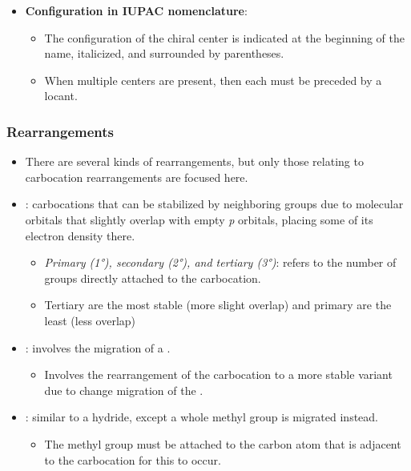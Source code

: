 \begin{itemize}
\begin{itemize}
    \bigskip

    \item \textbf{Configuration in IUPAC nomenclature}:
    \begin{itemize}
        \item The configuration of the chiral center is indicated at the beginning of the name, italicized, and surrounded by parentheses.
        \item When multiple centers are present, then each must be preceded by a locant.
    \end{itemize}
  \end{itemize}

  \subsubsection{Rearrangements}\label{Rearrangements}
    \begin{itemize}
        \item There are several kinds of rearrangements, but only those relating to carbocation rearrangements are focused here.
        \item {}: carbocations that can be stabilized by neighboring groups due to molecular orbitals that slightly overlap with empty \textit{p} orbitals, placing some of its electron density there.
            \begin{itemize}
                \item \emph{Primary (\ang{1}), secondary (\ang{2}), and tertiary (\ang{3})}: refers to the number of groups directly attached to the carbocation.
                \item Tertiary are the most stable (more slight overlap) and primary are the least (less overlap)
            \end{itemize}
        \item {}: involves the migration of a .
            \begin{itemize}
                \item Involves the rearrangement of the carbocation to a more stable variant due to change migration of the .
            \end{itemize}
        \item {}: similar to a hydride, except a whole methyl group is migrated instead.
            \begin{itemize}
                \item The methyl group must be attached to the carbon atom that is adjacent to the carbocation for this to occur.
            \end{itemize}
    \end{itemize}
\end{itemize}

